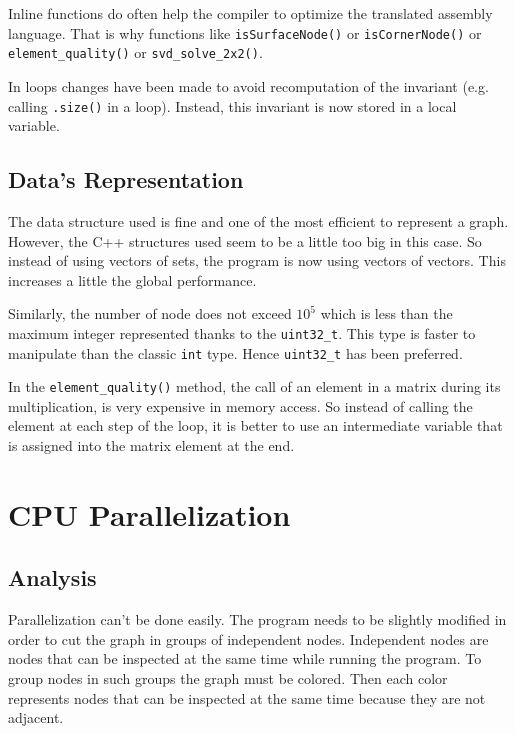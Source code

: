 \documentclass[fleqn,11pt]{SelfArx} %
\begin{document}
Inline functions do often help the compiler to optimize the translated assembly language. That is why functions like \verb+isSurfaceNode()+ or \verb+isCornerNode()+ or \verb+element_quality()+ or \verb+svd_solve_2x2()+.

In loops changes have been made to avoid recomputation of the invariant (e.g. calling \verb+.size()+ in a loop). Instead, this invariant is now stored in a local variable.

\subsection{Data's Representation}

The data structure used is fine and one of the most efficient to represent a graph. However, the C++ structures used seem to be a little too big in this case. So instead of using vectors of sets, the program is now using vectors of vectors. This increases a little the global performance.

Similarly, the number of node does not exceed $10^5$ which is less than the maximum integer represented thanks to the \verb+uint32_t+. This type is faster to manipulate than the classic \verb+int+ type. Hence \verb+uint32_t+ has been preferred.

In the \verb+element_quality()+ method, the call of an element in a matrix during its multiplication, is very expensive in memory access. So instead of calling the element at each step of the loop, it is better to use an intermediate variable that is assigned into the matrix element at the end.


\section{CPU Parallelization}

\subsection{Analysis}

Parallelization can't be done easily. The program needs to be slightly modified in order to cut the graph in groups of independent nodes. Independent nodes are nodes that can be inspected at the same time while running the program. To group nodes in such groups the graph must be colored. Then each color represents nodes that can be inspected at the same time because they are not adjacent.
\end{document}
